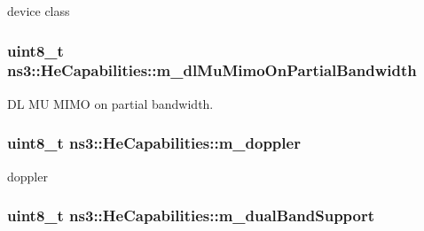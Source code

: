 device class 

\subsubsection[{\texorpdfstring{m\+\_\+dl\+Mu\+Mimo\+On\+Partial\+Bandwidth}{m_dlMuMimoOnPartialBandwidth}}]{\setlength{\rightskip}{0pt plus 5cm}uint8\+\_\+t ns3\+::\+He\+Capabilities\+::m\+\_\+dl\+Mu\+Mimo\+On\+Partial\+Bandwidth\hspace{0.3cm}{\ttfamily [private]}}\hypertarget{classns3_1_1HeCapabilities_aac23f94dbf47c9c855089ebbef9637e3}{}\label{classns3_1_1HeCapabilities_aac23f94dbf47c9c855089ebbef9637e3}


DL MU M\+I\+MO on partial bandwidth. 

\subsubsection[{\texorpdfstring{m\+\_\+doppler}{m_doppler}}]{\setlength{\rightskip}{0pt plus 5cm}uint8\+\_\+t ns3\+::\+He\+Capabilities\+::m\+\_\+doppler\hspace{0.3cm}{\ttfamily [private]}}\hypertarget{classns3_1_1HeCapabilities_abcc2b218c56f4d0b84cd4ea433cde69f}{}\label{classns3_1_1HeCapabilities_abcc2b218c56f4d0b84cd4ea433cde69f}


doppler 

\subsubsection[{\texorpdfstring{m\+\_\+dual\+Band\+Support}{m_dualBandSupport}}]{\setlength{\rightskip}{0pt plus 5cm}uint8\+\_\+t ns3\+::\+He\+Capabilities\+::m\+\_\+dual\+Band\+Support\hspace{0.3cm}{\ttfamily [private]}}\hypertarget{classns3_1_1HeCapabilities_a04f73bb72b43ddef5fb488852125bdb2}{}\label{classns3_1_1HeCapabilities_a04f73bb72b43ddef5fb488852125bdb2}


